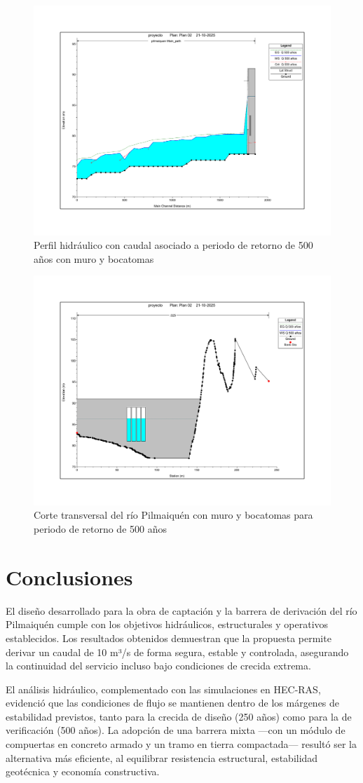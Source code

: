 \documentclass{article} %
\begin{document}
\begin{figure}[H]
    \centering
    \includegraphics[width=0.6\linewidth]{imagenes/perfil_500_cb.pdf}
    \caption{Perfil hidráulico con caudal asociado a periodo de retorno de 500 años con muro y bocatomas}
\end{figure}

\begin{figure}[H]
    \centering
    \includegraphics[width=0.6\linewidth]{imagenes/corte_500_cb.pdf}
    \caption{Corte transversal del río Pilmaiquén con muro y bocatomas para periodo de retorno de 500 años}
\end{figure}

\newpage
\section{Conclusiones}

El diseño desarrollado para la obra de captación y la barrera de derivación del río Pilmaiquén cumple con los objetivos hidráulicos, estructurales y operativos establecidos. Los resultados obtenidos demuestran que la propuesta permite derivar un caudal de 10 m³/s de forma segura, estable y controlada, asegurando la continuidad del servicio incluso bajo condiciones de crecida extrema.

El análisis hidráulico, complementado con las simulaciones en HEC-RAS, evidenció que las condiciones de flujo se mantienen dentro de los márgenes de estabilidad previstos, tanto para la crecida de diseño (250 años) como para la de verificación (500 años). La adopción de una barrera mixta —con un módulo de compuertas en concreto armado y un tramo en tierra compactada— resultó ser la alternativa más eficiente, al equilibrar resistencia estructural, estabilidad geotécnica y economía constructiva.
\end{document}
